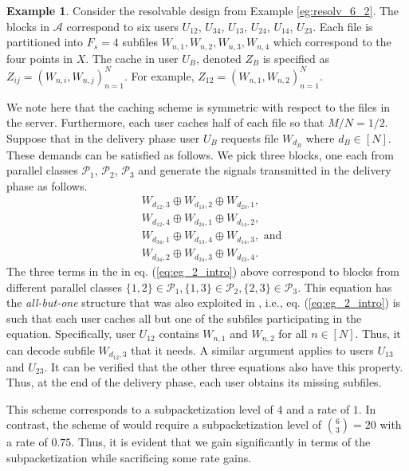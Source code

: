 \documentclass[journal,twocolumn]{IEEEtran}
\theoremstyle{definition}
\newtheorem{example}{Example}
\newcommand{\calA}{\mathcal{A}}
\newcommand{\calP}{\mathcal{P}}
\begin{document}
\begin{example}
\label{eg:placement_q_2_k_3}
Consider the resolvable design from Example \ref{eg:resolv_6_2}. The blocks in $\calA$ correspond to six users $U_{12}$, $U_{34}$, $U_{13}$, $U_{24}$, $U_{14}$, $U_{23}$. Each file is partitioned into $F_s=4$ subfiles $W_{n,1}, W_{n,2}, W_{n,3}, W_{n,4}$ which correspond to the four points in $X$. The cache in user $U_{B}$, denoted $Z_{B}$ is specified as $Z_{ij}=(W_{n,i},W_{n,j})_{n=1}^N$. For example, $Z_{12}=(W_{n,1}, W_{n,2})_{n=1}^{N}$.

We note here that the caching scheme is symmetric with respect to the files in the server. Furthermore, each user caches half of each file so that $M/N = 1/2$.
Suppose that in the delivery phase user $U_B$ requests file $W_{d_{B}}$ where $d_B \in [N]$. These demands can be satisfied as follows. We pick three blocks, one each from parallel classes $\calP_1$, $\calP_2$, $\calP_3$ and generate the signals transmitted in the delivery phase as follows.
\begin{align}
	&W_{d_{12},3}\oplus W_{d_{13},2}\oplus W_{d_{23},1}, \label{eq:eg_2_intro}\\
    &W_{d_{12},4}\oplus W_{d_{24},1}\oplus W_{d_{14},2}, \nonumber\\
    &W_{d_{34},1}\oplus W_{d_{13},4}\oplus W_{d_{14},3}, \text{~and} \nonumber\\
    &W_{d_{34},2}\oplus W_{d_{24},3}\oplus W_{d_{23},4}. \nonumber
\end{align}
The three terms in the in eq. (\ref{eq:eg_2_intro}) above correspond to blocks from different parallel classes $\{1,2\}\in \calP_1, \{1,3\}\in \calP_2 ,\{2,3\}\in \calP_3$. This equation has the {\it all-but-one} structure that was also exploited in \cite{maddahN14}, i.e., eq. (\ref{eq:eg_2_intro}) is such that each user caches all but one of the subfiles participating in the equation. Specifically, user $U_{12}$ contains $W_{n,1}$ and $W_{n,2}$ for all $n \in [N]$. Thus, it can decode subfile $W_{d_{12},3}$ that it needs. A similar argument applies to users $U_{13}$ and $U_{23}$. It can be verified that the other three equations also have this property. Thus, at the end of the delivery phase, each user obtains its missing subfiles.


This scheme corresponds to a subpacketization level of $4$ and a rate of $1$. In contrast, the scheme of \cite{maddahN14} would require a subpacketization level of $\binom{6}{3} = 20$ with a rate of $0.75$. Thus, it is evident that we gain significantly in terms of the subpacketization while sacrificing some rate gains.
\end{example}
\end{document}
